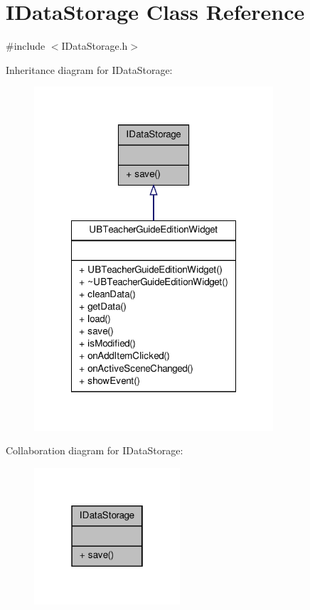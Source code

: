 \hypertarget{class_i_data_storage}{\section{I\-Data\-Storage Class Reference}
\label{d6/d6d/class_i_data_storage}
}


{\ttfamily \#include $<$I\-Data\-Storage.\-h$>$}



Inheritance diagram for I\-Data\-Storage\-:
\nopagebreak
\begin{figure}[H]
\begin{center}
\leavevmode
\includegraphics[width=252pt]{d1/da2/class_i_data_storage__inherit__graph}
\end{center}
\end{figure}


Collaboration diagram for I\-Data\-Storage\-:
\nopagebreak
\begin{figure}[H]
\begin{center}
\leavevmode
\includegraphics[width=154pt]{d2/d48/class_i_data_storage__coll__graph}
\end{center}
\end{figure}
